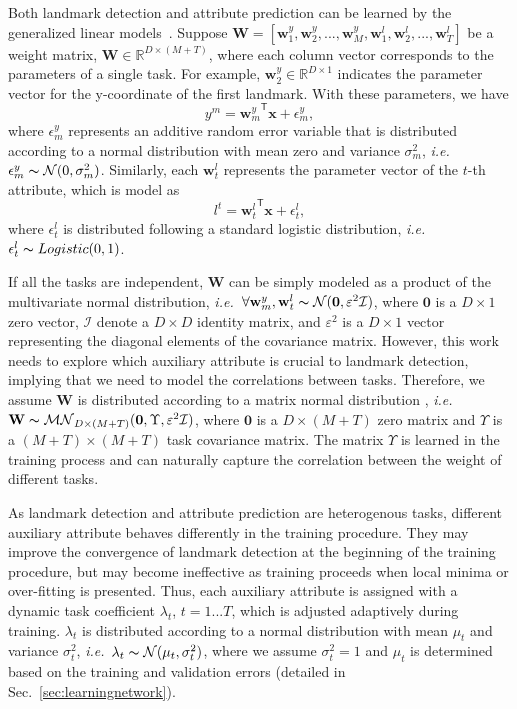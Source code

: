 \documentclass[10pt,journal,compsoc]{IEEEtran}
\newcommand{\x} {\textbf{x}}
\newcommand{\w} {\textbf{w}}
\newcommand{\W} {\textbf{W}}
\newcommand{\trans}[1]{{#1}^{\ensuremath{\mathsf{T}}}}
\newcommand{\ie}{\emph{i.e.}~}
\begin{document}
Both landmark detection and attribute prediction can be learned by the generalized linear models~\cite{mccullagh1989generalized}.
Suppose $\W=[\w^y_1,\w^y_2,...,\w^y_M,\w^l_1,\w^l_2,...,\w^l_T]$ be a weight matrix, $\W\in\mathbb{R}^{D\times{(M+T)}}$, where each column vector corresponds to the parameters of a single task.
For example, $\w^y_2\in\mathbb{R}^{D\times1}$ indicates the parameter vector for the y-coordinate of the first landmark.
With these parameters, we have
\begin{equation}\label{eq:y}
y^m=\trans{\w^y_m}\x+\epsilon_m^y,
\end{equation}
where $\epsilon_m^y$ represents an additive random error variable that is distributed according to a normal distribution with mean zero and variance $\sigma_m^2$, \ie $\epsilon_m^y\thicksim\mathcal{N}(0,\sigma_m^2)$.
Similarly, each $\w^l_t$ represents the parameter vector of the $t$-th attribute, which is model as
\begin{equation}\label{eq:l}
l^t=\trans{\w^l_t}\x+\epsilon^l_t,
\end{equation}
where $\epsilon^l_t$ is distributed following a standard logistic distribution, \ie $\epsilon^l_t\thicksim Logistic(0,1)$.






If all the tasks are independent, $\W$ can be simply modeled as a product of the multivariate normal distribution, \ie $\forall\w^y_m,\w^l_t\thicksim\mathcal{N}(\textbf{0},\varepsilon^2\mathcal{I})$, where $\textbf{0}$ is a $D\times1$ zero vector, $\mathcal{I}$ denote a $D\times D$ identity matrix, and $\varepsilon^2$ is a $D\times1$ vector representing the diagonal elements of the covariance matrix.
However, this work needs to explore which auxiliary attribute is crucial to landmark detection, implying that we need to model the correlations between tasks.
Therefore, we assume $\W$ is distributed according to a matrix normal distribution \cite{gupta1999matrix}, \ie $\W\thicksim \mathcal{MN}_{D\times(M+T)}(\mathbf{0},\Upsilon,\varepsilon^2\mathcal{I})$, where $\textbf{0}$ is a $D\times(M+T)$ zero matrix and $\Upsilon$ is a $(M+T)\times(M+T)$ task covariance matrix. The matrix $\Upsilon$ is learned in the training process and can naturally capture the correlation between the weight of different tasks.



As landmark detection and attribute prediction are heterogenous tasks, different auxiliary attribute behaves differently in the training procedure. They may improve the convergence of landmark detection at the beginning of the training procedure, but may become ineffective as training proceeds when local minima or over-fitting is presented.
Thus, each auxiliary attribute is assigned with a dynamic task coefficient $\lambda_t$, $t=1...T$, which is adjusted adaptively during training.
$\lambda_t$ is distributed according to a normal distribution with mean $\mu_t$ and variance $\sigma^2_t$, \ie $\lambda_t\thicksim\mathcal{N}(\mu_t,\sigma^2_t)$, where we assume $\sigma^2_t=1$ and $\mu_t$ is determined based on the training and validation errors (detailed in Sec.~\ref{sec:learningnetwork}).
\end{document}
